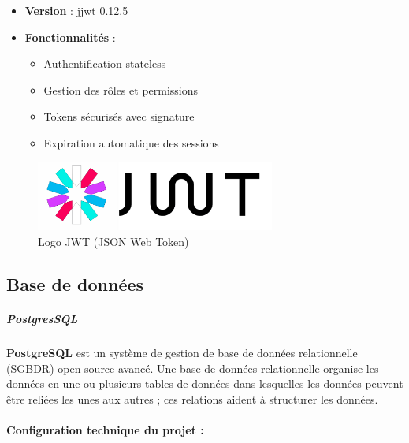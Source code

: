 \documentclass[12pt,a4paper,twoside]{report}
\begin{document}
\begin{itemize}
\item
  \textbf{Version} : jjwt 0.12.5
\item
  \textbf{Fonctionnalités} :

  \begin{itemize}
  \item
    Authentification stateless
  \item
    Gestion des rôles et permissions
  \item
    Tokens sécurisés avec signature
  \item
    Expiration automatique des sessions
  \end{itemize}
\end{itemize}

\begin{figure}[H]
\centering
\includegraphics[width=0.7\textwidth]{latex_media/media/image25.png}
\caption{Logo JWT (JSON Web Token)}
\label{fig:logo-jwt}
\end{figure}

\hypertarget{base-de-donnuxe9es}{%
\subsection{\texorpdfstring{Base de données
}{Base de données }}\label{base-de-donnuxe9es}}

\hypertarget{postgressql}{%
\subparagraph{\texorpdfstring{\textbf{PostgresSQL}~}{PostgresSQL~}}\label{postgressql}}

\textbf{PostgreSQL} est un système de gestion de base de données
relationnelle (SGBDR) open-source avancé. Une base de données
relationnelle organise les données en une ou plusieurs tables de données
dans lesquelles les données peuvent être reliées les unes aux autres ;
ces relations aident à structurer les données.

\hypertarget{configuration-technique-du-projet-3}{%
\paragraph{\texorpdfstring{\textbf{Configuration technique du projet
:}}{Configuration technique du projet :}}\label{configuration-technique-du-projet-3}}
\end{document}
